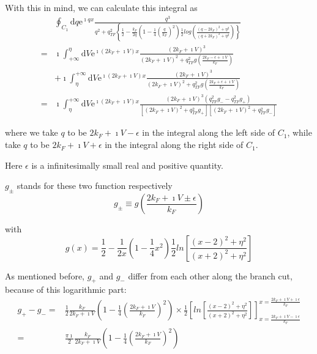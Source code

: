 \begin{itemize}
With this in mind, we can calculate this integral as
\begin{equation} \label{Eqs3.1.33} \begin{split}
&\oint_{C_1} \mathrm{d} q \mathrm{e}^{\imath q x} \frac{q^3}{q^2 + q_{TF}^2 \left\{\frac{1}{2}-\frac{k_F}{2q}\left( 1-\frac{1}{4}(\frac{q}{k_F})^2 \right) \frac{1}{2} log \left( \frac{(q-2 k_F)^2 + \eta^2}{(q + 2 k_F)^2 + \eta^2}\right) \right\}}\\
=& \imath \int_{+\infty}^{\eta} \mathrm{d} V \mathrm{e}^{\imath(2 k_F+\imath V) x} \frac{(2 k_F+\imath V)^3}{(2 k_F+\imath V)^2 + q_{TF}^2 g\left( \frac{2 k_F - \epsilon + \imath V}{k_F} \right)}\\
&+\imath \int_{\eta}^{+\infty} \mathrm{d} V \mathrm{e}^{\imath(2 k_F+\imath V) x} \frac{(2 k_F+\imath V)^3}{(2 k_F+\imath V)^2 + q_{TF}^2 g\left( \frac{2 k_F + \epsilon + \imath V}{k_F} \right)}\\
=& \imath \int_{\eta}^{+\infty} \mathrm{d}V \mathrm{e}^{\imath(2 k_F+\imath V) x} \frac{(2 k_F+\imath V)^3\left( q_{TF}^2 g_- - q_{TF}^2 g_+ \right)}{\left[(2 k_F+\imath V)^2 + q_{TF}^2 g_+ \right]\left[(2 k_F+\imath V)^2 + q_{TF}^2 g_- \right]}
\end{split} \end{equation}

where we take $q$ to be $2 k_F +\imath V -\epsilon$ in the integral along the left side of $C_1$, while take $q$ to be $2 k_F +\imath V + \epsilon$ in the integral along the right side of $C_1$.

Here $\epsilon$ is a infinitesimally small real and positive quantity.

$g_\pm$ stands for these two function respectively
\[ g_\pm \equiv g\left( \frac{2 k_F + \imath V \pm \epsilon}{k_F} \right) \]

with
\[ g(x) = \frac{1}{2} - \frac{1}{2x} \left( 1- \frac{1}{4}x^2 \right) \frac{1}{2} ln\left[ \frac{(x-2)^2 + \eta^2}{(x+2)^2+\eta^2} \right] \]

As mentioned before, $g_+$ and $g_-$ differ from each other along the branch cut, because of this logarithmic part:
\[\begin{split}
g_+-g_- = & \frac{1}{2} \frac{k_F}{2 k_F + \imath V} \left( 1- \frac{1}{4}\left( \frac{2 k_F +\imath V}{k_F} \right)^2 \right) \times \frac{1}{2} \left[ ln \left[ \frac{(x-2)^2+\eta^2}{(x+2)^2+\eta^2}\right] \right]_{x=\frac{2 k_F +\imath V -\imath\epsilon}{k_F}}^{x=\frac{2 k_F +\imath V +\imath\epsilon}{k_F}}\\
=& \frac{\pi \imath}{2} \frac{k_F}{2 k_F + \imath V} \left( 1- \frac{1}{4}\left( \frac{2 k_F +\imath V}{k_F} \right)^2 \right)
\end{split}\]


\end{itemize}

